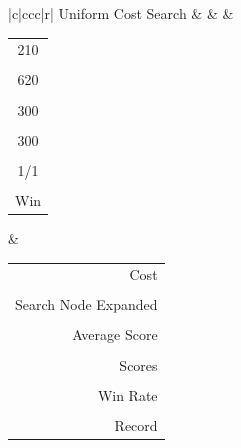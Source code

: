 \documentclass[
10pt, %
a4paper, %
oneside, %
headinclude,footinclude, %
BCOR5mm, %
]{scrartcl}
\begin{document}
\begin{table}[]
{\begin{tabular}{|c|ccc|r|}
			Uniform Cost Search                                                    &     &        & \begin{tabular}[c]{@{}c@{}}210\\ \\ 620\\ \\ 300\\ \\ 300\\ \\ 1/1\\ \\ Win\end{tabular} & \begin{tabular}[c]{@{}r@{}}Cost\\   \\ Search Node Expanded\\  \\ Average Score\\  \\ Scores\\  \\ Win Rate\\  \\ Record\end{tabular} \\ \hline

\end{tabular}}
\end{table}
\end{document}

